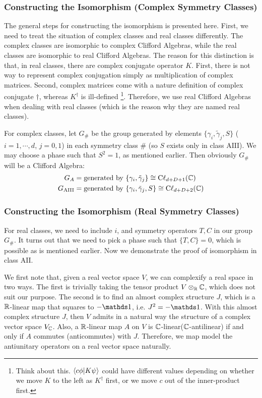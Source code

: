 \documentclass{article}
\begin{document}
\subsubsection{Constructing the Isomorphism (Complex Symmetry Classes)}
\label{sec:Complex Classes-iso}
The general steps for constructing the isomorphism is presented here. First, we
need to treat the situation of complex classes and real classes
differently. The complex classes are isomorphic to complex Clifford Algebras,
while the real classes are isomorphic to real Clifford Algebras. The reason for
this distinction is that, in real classes, there are complex conjugate operator
$K$. First, there is not way to represent complex conjugation simply as
multiplication of complex matrices. Second, complex matrices come with a nature
definition of complex conjugate $\dagger$, whereas $K^\dagger$ is ill-defined
\footnote{Think about this. $\braket{c \phi |K \psi}$ could have different
    values depending on whether we move $K$ to the left as $K^\dagger$ first, or
we move $c$ out of the inner-product first.}. Therefore, we use real Clifford
Algebras when dealing with real classes (which is the reason why they are named
real classes).

For complex classes, let $G_\#$ be the group generated by elements
$\{\gamma_i,\tilde{\gamma}_j,S\}$ ($i=1,\cdots,d$, $j=0,1$) in each symmetry
class $\#$ (so $S$ exists only in class $\mathrm{AIII}$). We may choose a phase
such that $S^2=1$, as mentioned earlier. Then obviously $G_\#$ will be a
Clifford Algebra:
\begin{align}
    G_{A} &= \text{generated by }\{\gamma_i,\tilde{\gamma}_j\} \cong
    \mathrm{C\ell}_{d+D+1}(\mathbb{C}) \\
    G_{\mathrm{AIII}} &= \text{generated by }\{\gamma_i,\tilde{\gamma}_j,S\}
    \cong  \mathrm{C\ell}_{d+D+2}(\mathbb{C})
\end{align}

\subsubsection{Constructing the Isomorphism (Real Symmetry Classes)}
\label{sec:Real Classes-iso}

For real classes, we need to include $i$, and symmetry operators $T,C$ in our
group $G_\#$. It turns out that we need to pick a phase such that $\{T,C\}=0$,
which is possible as is mentioned earlier. Now we demonstrate the proof of
isomorphism in class $\mathrm{AII}$.

We first note that, given a real vector space $V$, we can complexify a real space in
two ways. The first is trivially taking the tensor product $V\otimes_{\mathbb{R}} \mathbb{C}$,
which does not suit our purpose. The second is to find an almost complex
structure $J$, which is a $\mathbb{R}$-linear map that squares to $-\id$, i.e.
$J^2=-\id$. With this almost complex structure $J$, then $V$ admits in a natural
way the structure of a complex vector space $V_{\mathbb{C}}$\cite{DanielHuybrechts2005}. Also, a
$\mathbb{R}$-linear map $A$ on $V$ is $\mathbb{C}$-linear($\mathbb{C}$-antilinear) if and only if $A$
commutes (anticommutes) with $J$. Therefore, we map model the antiunitary
operators on a real vector space naturally.
\end{document}
